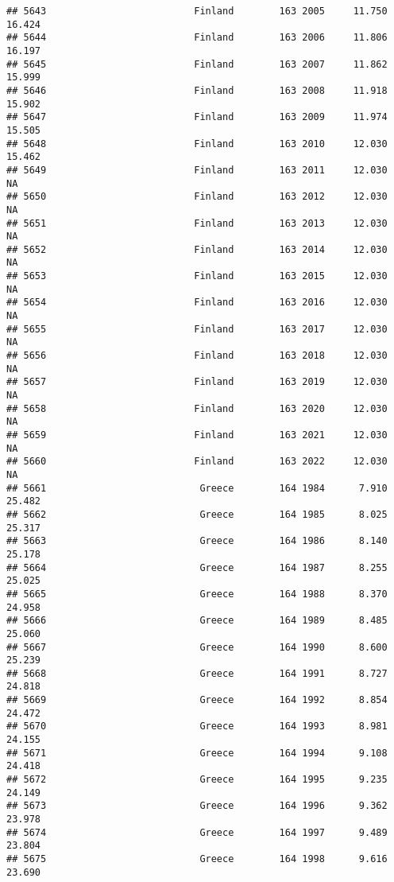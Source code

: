 \documentclass[
]{article}
\begin{document}
\begin{verbatim}
## 5643                          Finland        163 2005     11.750     16.424
## 5644                          Finland        163 2006     11.806     16.197
## 5645                          Finland        163 2007     11.862     15.999
## 5646                          Finland        163 2008     11.918     15.902
## 5647                          Finland        163 2009     11.974     15.505
## 5648                          Finland        163 2010     12.030     15.462
## 5649                          Finland        163 2011     12.030         NA
## 5650                          Finland        163 2012     12.030         NA
## 5651                          Finland        163 2013     12.030         NA
## 5652                          Finland        163 2014     12.030         NA
## 5653                          Finland        163 2015     12.030         NA
## 5654                          Finland        163 2016     12.030         NA
## 5655                          Finland        163 2017     12.030         NA
## 5656                          Finland        163 2018     12.030         NA
## 5657                          Finland        163 2019     12.030         NA
## 5658                          Finland        163 2020     12.030         NA
## 5659                          Finland        163 2021     12.030         NA
## 5660                          Finland        163 2022     12.030         NA
## 5661                           Greece        164 1984      7.910     25.482
## 5662                           Greece        164 1985      8.025     25.317
## 5663                           Greece        164 1986      8.140     25.178
## 5664                           Greece        164 1987      8.255     25.025
## 5665                           Greece        164 1988      8.370     24.958
## 5666                           Greece        164 1989      8.485     25.060
## 5667                           Greece        164 1990      8.600     25.239
## 5668                           Greece        164 1991      8.727     24.818
## 5669                           Greece        164 1992      8.854     24.472
## 5670                           Greece        164 1993      8.981     24.155
## 5671                           Greece        164 1994      9.108     24.418
## 5672                           Greece        164 1995      9.235     24.149
## 5673                           Greece        164 1996      9.362     23.978
## 5674                           Greece        164 1997      9.489     23.804
## 5675                           Greece        164 1998      9.616     23.690

\end{verbatim}
\end{document}
